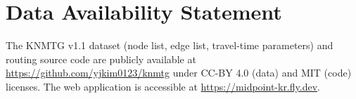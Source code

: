\documentclass[12pt]{article}
\begin{document}
\section*{Data Availability Statement}

The KNMTG v1.1 dataset (node list, edge list, travel-time parameters)
and routing source code are publicly available at
\url{https://github.com/yjkim0123/knmtg} under CC-BY 4.0 (data)
and MIT (code) licenses. The web application is accessible at
\url{https://midpoint-kr.fly.dev}.



\end{document}
